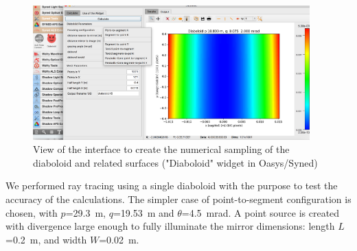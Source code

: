 \documentclass{iucr}              %
\begin{document}
\begin{figure}\label{fig:widget}
\centering
\includegraphics[width=0.95\textwidth]{figures/widget.png}
\caption{View of the interface to create the numerical sampling of the diaboloid and related surfaces ("Diaboloid" widget in Oasys/Syned) }
\end{figure}


We performed ray tracing using a single diaboloid with the purpose to test the accuracy of the calculations. The simpler case of point-to-segment configuration is chosen, with $p$=29.3~m, $q$=19.53~m and $\theta$=4.5~mrad. A point source is created with divergence large enough to fully illuminate the mirror dimensions: length $L$=0.2~m, and width $W$=0.02~m.
\end{document}
